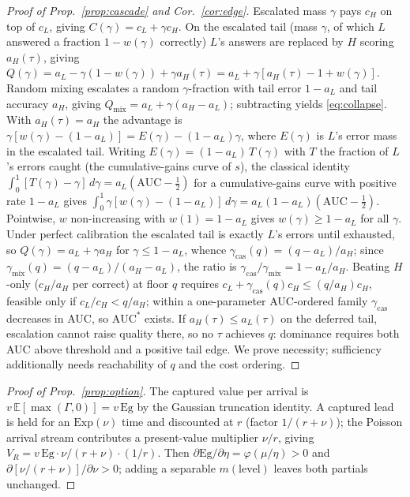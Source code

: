 \documentclass[11pt]{article}
\theoremstyle{plain}
\theoremstyle{definition}
\newcommand{\E}{\mathbb{E}}
\begin{document}
\begin{proof}[Proof of Prop.~\ref{prop:cascade} and Cor.~\ref{cor:edge}]
Escalated mass $\gamma$ pays $c_H$ on top of $c_L$, giving $C(\gamma)=c_L+\gamma c_H$. On the escalated tail (mass $\gamma$, of which $L$
answered a fraction $1-w(\gamma)$ correctly) $L$'s answers are replaced by $H$ scoring $a_H(\tau)$, giving
$Q(\gamma)=a_L-\gamma(1-w(\gamma))+\gamma a_H(\tau)=a_L+\gamma[a_H(\tau)-1+w(\gamma)]$. Random mixing
escalates a random $\gamma$-fraction with tail error $1-a_L$ and tail accuracy $a_H$, giving $Q_{\mathrm{mix}}=a_L+\gamma(a_H-a_L)$;
subtracting yields \eqref{eq:collapse}. With $a_H(\tau)=a_H$ the advantage is $\gamma[w(\gamma)-(1-a_L)]=E(\gamma)-(1-a_L)\gamma$, where
$E(\gamma)$ is $L$'s error mass in the escalated tail. Writing $E(\gamma)=(1-a_L)\,T(\gamma)$ with $T$ the fraction of $L$'s errors caught
(the cumulative-gains curve of $s$), the classical identity $\int_0^1[T(\gamma)-\gamma]\,d\gamma=a_L(\mathrm{AUC}-\tfrac12)$ for a
cumulative-gains curve with positive rate $1-a_L$ gives $\int_0^1\gamma[w(\gamma)-(1-a_L)]\,d\gamma=a_L(1-a_L)(\mathrm{AUC}-\tfrac12)$.
Pointwise, $w$ non-increasing with $w(1)=1-a_L$ gives $w(\gamma)\ge1-a_L$ for all $\gamma$. Under perfect calibration the escalated tail
is exactly $L$'s errors until exhausted, so $Q(\gamma)=a_L+\gamma a_H$ for $\gamma\le 1-a_L$, whence $\gamma_{\mathrm{cas}}(q)=(q-a_L)/a_H$;
since $\gamma_{\mathrm{mix}}(q)=(q-a_L)/(a_H-a_L)$, the ratio is $\gamma_{\mathrm{cas}}/\gamma_{\mathrm{mix}}=1-a_L/a_H$. Beating
$H$-only ($c_H/a_H$ per correct) at floor $q$ requires $c_L+\gamma_{\mathrm{cas}}(q)c_H\le(q/a_H)c_H$, feasible only if $c_L/c_H<q/a_H$;
within a one-parameter AUC-ordered family $\gamma_{\mathrm{cas}}$ decreases in AUC, so $\mathrm{AUC}^\ast$ exists. If $a_H(\tau)\le a_L(\tau)$
on the deferred tail, escalation cannot raise quality there, so no $\tau$ achieves $q$: dominance requires both AUC above threshold and a
positive tail edge. We prove necessity; sufficiency additionally needs reachability of $q$ and the cost ordering.
\end{proof}
\begin{proof}[Proof of Prop.~\ref{prop:option}]
The captured value per arrival is $v\,\E[\max(\Gamma,0)]=v\,\mathrm{Eg}$ by the Gaussian truncation identity. A captured lead is held for an
$\mathrm{Exp}(\nu)$ time and discounted at $r$ (factor $1/(r+\nu)$); the Poisson arrival stream contributes a present-value
multiplier $\nu/r$, giving $V_R=v\,\mathrm{Eg}\cdot\nu/(r+\nu)\cdot(1/r)$. Then $\partial\mathrm{Eg}/\partial\eta=\varphi(\mu/\eta)>0$
and $\partial[\nu/(r+\nu)]/\partial\nu>0$; adding a separable $m(\text{level})$ leaves both partials unchanged.
\end{proof}
\end{document}
